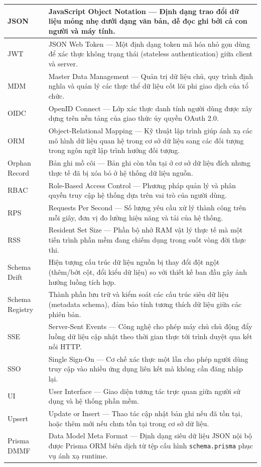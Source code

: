 \documentclass[twoside, final]{hcmut-report}
\begin{document}
\begin{center}
\begin{longtable}{|p{4cm}|p{11cm}|}
JSON & JavaScript Object Notation --- Định dạng trao đổi dữ liệu mỏng nhẹ dưới dạng văn bản, dễ đọc ghi bởi cả con người và máy tính. \\ \hline
JWT & JSON Web Token --- Một định dạng token mã hóa nhỏ gọn dùng để xác thực không trạng thái (stateless authentication) giữa client và server. \\ \hline
MDM & Master Data Management --- Quản trị dữ liệu chủ, quy trình định nghĩa và quản lý các thực thể dữ liệu cốt lõi phi giao dịch của tổ chức. \\ \hline
OIDC & OpenID Connect --- Lớp xác thực danh tính người dùng được xây dựng trên nền tảng của giao thức ủy quyền OAuth 2.0. \\ \hline
ORM & Object-Relational Mapping --- Kỹ thuật lập trình giúp ánh xạ các mô hình dữ liệu quan hệ trong cơ sở dữ liệu sang các đối tượng trong ngôn ngữ lập trình hướng đối tượng. \\ \hline
Orphan Record & Bản ghi mồ côi --- Bản ghi còn tồn tại ở cơ sở dữ liệu đích nhưng thực tế đã bị xóa bỏ ở hệ thống dữ liệu nguồn. \\ \hline
RBAC & Role-Based Access Control --- Phương pháp quản lý và phân quyền truy cập hệ thống dựa trên vai trò của người dùng. \\ \hline
RPS & Requests Per Second --- Số lượng yêu cầu xử lý thành công trên mỗi giây, đơn vị đo lường hiệu năng và tải của hệ thống. \\ \hline
RSS & Resident Set Size --- Phần bộ nhớ RAM vật lý thực tế mà một tiến trình phần mềm đang chiếm dụng trong suốt vòng đời thực thi. \\ \hline
Schema Drift & Hiện tượng cấu trúc dữ liệu nguồn bị thay đổi đột ngột (thêm/bớt cột, đổi kiểu dữ liệu) so với thiết kế ban đầu gây ảnh hưởng luồng tích hợp. \\ \hline
Schema Registry & Thành phần lưu trữ và kiểm soát các cấu trúc siêu dữ liệu (metadata schema), đảm bảo tính tương thích dữ liệu giữa các phiên bản. \\ \hline
SSE & Server-Sent Events --- Công nghệ cho phép máy chủ chủ động đẩy luồng dữ liệu cập nhật theo thời gian thực tới trình duyệt qua kết nối HTTP. \\ \hline
SSO & Single Sign-On --- Cơ chế xác thực một lần cho phép người dùng truy cập vào nhiều ứng dụng liên kết mà không cần đăng nhập lại. \\ \hline
UI & User Interface --- Giao diện tương tác trực quan giữa người sử dụng và hệ thống phần mềm. \\ \hline
Upsert & Update or Insert --- Thao tác cập nhật bản ghi nếu đã tồn tại, hoặc thêm mới nếu chưa tồn tại trong cơ sở dữ liệu. \\ \hline
Prisma DMMF & Data Model Meta Format --- Định dạng siêu dữ liệu JSON nội bộ được Prisma ORM biên dịch từ tệp cấu hình \texttt{schema.prisma} phục vụ ánh xạ runtime. \\ \hline
\end{longtable}
\end{center}
\end{document}
